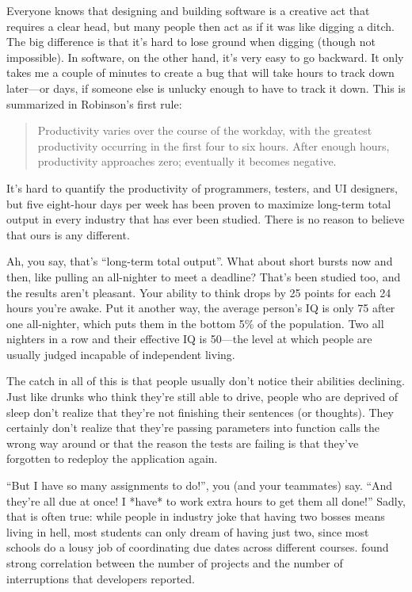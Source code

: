 \documentclass[10pt,letterpaper]{article}
\begin{document}
Everyone knows that designing and building software is a creative act
that requires a clear head, but many people then act as if it was like digging a
ditch.  The big difference is that it's hard to lose ground when digging (though
not impossible).  In software, on the other hand, it's very easy to go backward.
It only takes me a couple of minutes to create a bug that will take hours to
track down later---or days, if someone else is unlucky enough to have to track
it down.  This is summarized in Robinson's first rule:

\begin{quotation}

  Productivity varies over the course of the workday, with the
  greatest productivity occurring in the first four to six hours.
  After enough hours, productivity approaches zero; eventually it
  becomes negative.

\end{quotation}

It's hard to quantify the productivity of programmers, testers, and UI
designers, but five eight-hour days per week has been proven to maximize
long-term total output in every industry that has ever been studied. There is no
reason to believe that ours is any different.

Ah, you say, that's ``long-term total output''.  What about short bursts
now and then, like pulling an all-nighter to meet a deadline?  That's
been studied too, and the results aren't pleasant.  Your ability to
think drops by 25 points for each 24 hours you're awake.  Put it
another way, the average person's IQ is only 75 after one all-nighter,
which puts them in the bottom 5\% of the population.  Two all nighters
in a row and their effective IQ is 50---the level at which people are
usually judged incapable of independent living.

The catch in all of this is that people usually don't notice their
abilities declining.  Just like drunks who think they're still able to
drive, people who are deprived of sleep don't realize that they're not
finishing their sentences (or thoughts).  They certainly don't realize
that they're passing parameters into function calls the wrong way
around or that the reason the tests are failing is that they've
forgotten to redeploy the application again.

``But I have so many assignments to do!'', you (and your teammates) say.
``And they're all due at once!  I *have* to work extra hours to get
them all done!'' Sadly, that is often true: while people in industry
joke that having two bosses means living in hell, most students can
only dream of having just two, since most schools do a lousy job of
coordinating due dates across different courses.  \cite{Tregubov2017}
found strong correlation between the number of projects and the number
of interruptions that developers reported.
\end{document}
